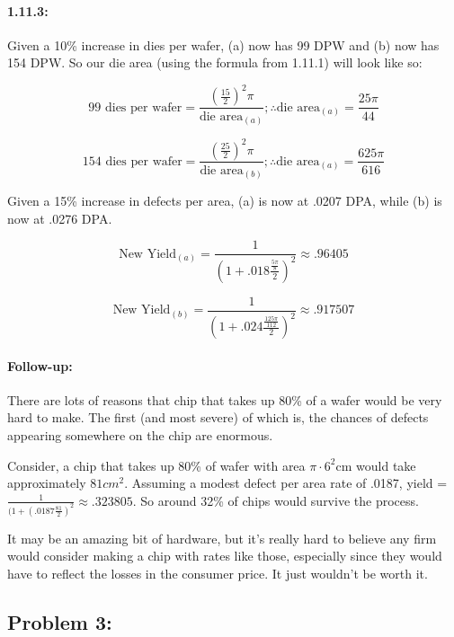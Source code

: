 \documentclass[a4paper]{article}
\begin{document}
\paragraph*{1.11.3:} Given a 10\% increase in dies per wafer, (a) now has 99 DPW and (b) now has 154 DPW. So our die area (using the formula from 1.11.1) will look like so:

\begin{equation}
99\mbox{ dies per wafer} = \frac{(\frac{15}{2})^2 \pi}{\mbox{die area}_{(a)}}; \therefore \mbox{die area}_{(a)} = \frac{25 \pi}{44}
\end{equation}

\begin{equation}
154\mbox{ dies per wafer} = \frac{(\frac{25}{2})^2 \pi}{\mbox{die area}_{(b)}}; \therefore \mbox{die area}_{(a)} = \frac{625 \pi}{616}
\end{equation}

Given a 15\% increase in defects per area, (a) is now at .0207 DPA, while (b) is now at .0276 DPA. 

\begin{equation}
\mbox{New Yield}_{(a)} = \frac{1}{(1+.018 \frac{\frac{5\pi}{8}}{2})^2} \approx{.96405}
\end{equation}

\begin{equation}
\mbox{New Yield}_{(b)} = \frac{1}{(1+.024 \frac{\frac{125\pi}{112}}{2})^2} \approx{.917507}
\end{equation}

\paragraph*{Follow-up:} There are lots of reasons that chip that takes up 80\% of a wafer would be very hard to make. The first (and most severe) of which is, the chances of defects appearing somewhere on the chip are enormous.

Consider, a chip that takes up 80\% of wafer with area $\pi\cdot6^2$cm would take approximately $81 cm^2$. Assuming a modest defect per area rate of .0187, yield = $\frac{1}{(1+(.0187\frac{81}{2})^2} \approx .323805$. So around 32\% of chips would survive the process.

It may be an amazing bit of hardware, but it's really hard to believe any firm would consider making a chip with rates like those, especially since they would have to reflect the losses in the consumer price. It just wouldn't be worth it.

\subsection*{Problem 3:}
\end{document}
